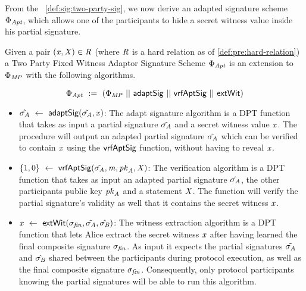 From the ~\cref{def:sig:two-party-sig}, we now derive an adapted signature scheme $\Phi_{\mathit{Apt}}$, which allows one of the participants to hide a secret witness value inside his partial signature.
\begin{definition}
    \label{def:sig:two-party-fixed-wit-apt-sig}
    Given a pair $(\mathit{x}, \mathit{X}) \in \mathit{R}$ (where $\mathit{R}$ is a hard relation as of \cref{def:pre:hard-relation}) a Two Party Fixed Witness Adaptor Signature Scheme $\Phi_{\mathit{Apt}}$ is an extension to $\Phi_{\mathit{MP}}$ with the following algorithms.

    \[ \Phi_{\mathit{Apt}} ~:=~ (\Phi_{\mathit{MP}} ~||~ \mathsf{adaptSig} ~||~ \mathsf{vrfAptSig} ~||~ \mathsf{extWit}) \]

    \begin{itemize}
        \item $\hat{\sigma_{\mathit{A}}} ~\leftarrow~ \mathsf{adaptSig}(\tilde{\sigma_{\mathit{A}}}, \mathit{x})$: The adapt signature algorithm is a DPT function that takes as input a partial signature $\tilde{\sigma_{\mathit{A}}}$ and a secret witness value $\mathit{x}$.
        The procedure will output an adapted partial signature $\hat{\sigma_{\mathit{A}}}$ which can be verified to contain $\mathit{x}$ using the $\mathsf{vrfAptSig}$ function, without having to reveal $\mathit{x}$.

        \item $\{1,0\} ~\leftarrow~ \mathsf{vrfAptSig}(\hat{\sigma_{\mathit{A}}},\mathit{m},\mathit{pk}_{\mathit{A}},\mathit{X})$: The verification algorithm is a DPT function that takes as input an adapted partial signature $\hat{\sigma_{\mathit{A}}}$, the other participants public key $\mathit{pk}_{\mathit{A}}$ and a statement $\mathit{X}$.
        The function will verify the partial signature's validity as well that it contains the secret witness $\mathit{x}$.

        \item $\mathit{x} ~\leftarrow~ \mathsf{extWit}(\sigma_{\mathit{fin}}, \tilde{\sigma_{\mathit{A}}}, \hat{\sigma_{\mathit{B}}})$: The witness extraction algorithm is a DPT function that lets Alice extract the secret witness $\mathit{x}$ after having learned the final composite signature $\sigma_{\mathit{fin}}$.
        As input it expects the partial signatures $\tilde{\sigma_{\mathit{A}}}$ and $\hat{\sigma_{\mathit{B}}}$ shared between the participants during protocol execution, as well as the final composite signature $\sigma_{\mathit{fin}}$.
        Consequently, only protocol participants knowing the partial signatures will be able to run this algorithm.
    \end{itemize}
\end{definition}

